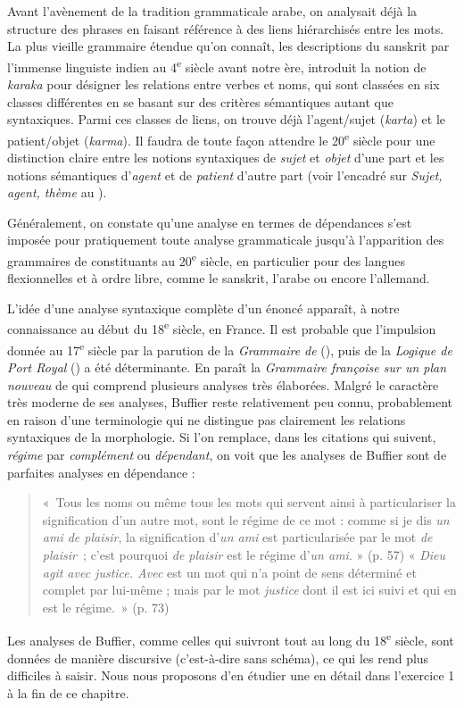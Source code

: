 {    Avant l’avènement de la tradition grammaticale arabe, on analysait déjà la structure des phrases en faisant référence à des liens hiérarchisés entre les mots. La plus vieille grammaire étendue qu’on connaît, les descriptions du sanskrit par l’immense linguiste indien  au 4\textsuperscript{e} siècle avant notre ère, introduit la notion de \textit{karaka} pour désigner les relations entre verbes et noms, qui sont classées en six classes différentes en se basant sur des critères sémantiques autant que syntaxiques. Parmi ces classes de liens, on trouve déjà l’agent/sujet (\textit{karta}) et le patient/objet (\textit{karma}). Il faudra de toute façon attendre le 20\textsuperscript{e} siècle pour une distinction claire entre les notions syntaxiques de \textit{sujet} et \textit{objet} d’une part et les notions sémantiques d’\textit{agent} et de \textit{patient} d’autre part (voir l’encadré sur \textit{Sujet, agent, thème} au ).

    Généralement, on constate qu’une analyse en termes de dépendances s’est imposée pour pratiquement toute analyse grammaticale jusqu’à l’apparition des grammaires de constituants au 20\textsuperscript{e} siècle, en particulier pour des langues flexionnelles et à ordre libre, comme le sanskrit, l’arabe ou encore l’allemand.

    L’idée d’une analyse syntaxique complète d’un énoncé apparaît, à notre connaissance au début du 18\textsuperscript{e} siècle, en France. Il est probable que l’impulsion donnée au 17\textsuperscript{e} siècle par la parution de la \textit{Grammaire de}  (\citealt{ArnauldLancelot1660}), puis de la \textit{Logique de Port Royal} (\citealt{ArnauldNicole1662}) a été déterminante. En \citeyear{buffier1709grammaire} paraît la \textit{Grammaire françoise sur un plan nouveau} de  qui comprend plusieurs analyses très élaborées. Malgré le caractère très moderne de ses analyses, Buffier reste relativement peu connu, probablement en raison d’une terminologie qui ne distingue pas clairement les relations syntaxiques de la morphologie. Si l’on remplace, dans les citations qui suivent, \textit{régime} par \textit{complément} ou \textit{dépendant}, on voit que les analyses de Buffier sont de parfaites analyses en dépendance :
    \begin{quote}
      «~Tous les noms ou même tous les mots qui servent ainsi à particulariser la signification d’un autre mot, sont le régime de ce mot : comme si je dis \textit{un ami de plaisir}, la signification d’\textit{un ami} est particularisée par le mot \textit{de plaisir~}; c’est pourquoi \textit{de plaisir} est le régime d’\textit{un ami}. » (p. 57) « \textit{Dieu agit avec justice. Avec} est un mot qui n’a point de sens déterminé et complet par lui-même ; mais par le mot \textit{justice} dont il est ici suivi et qui en est le régime.~» (p. 73) 
    \end{quote}
  Les analyses de Buffier, comme celles qui suivront tout au long du 18\textsuperscript{e} siècle, sont données de manière discursive (c’est-à-dire sans schéma), ce qui les rend plus difficiles à saisir. Nous nous proposons d’en étudier une en détail dans l'exercice 1 à la fin de ce chapitre.

}
